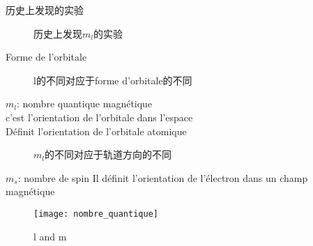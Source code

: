 \documentclass{article}
\begin{document}
历史上发现的实验
\begin{figure}[h!]
    \centering
    \hspace{7em} %
    \caption{历史上发现$m_l$的实验}
    \label{fig-sub}
\end{figure}

Forme de l'orbitale
\begin{figure}[h!]
    \centering
    \hspace{7em} %
    \hspace{7em} %
    \caption{l的不同对应于forme d'orbitale的不同}
    \label{fig-sub}
\end{figure}

$m_l$: nombre quantique magn\'etique\\
c'est l'orientation de l'orbitale dans l'espace\\
Définit l'orientation de l'orbitale atomique

\begin{figure}[h!]
    \centering
    \hspace{7em} %
    \hspace{7em} %
    \caption{$m_l$的不同对应于轨道方向的不同}
    \label{fig-sub}
\end{figure}

$m_s$: nombre de spin
Il définit l'orientation de l'électron dans un champ magnétique

\begin{figure}[!htbp]
		\centering
		\texttt{[image: nombre\_quantique]}
		\caption{l and m}
		\label{fig.nombre_quantique.l_m}
\end{figure}
\end{document}
